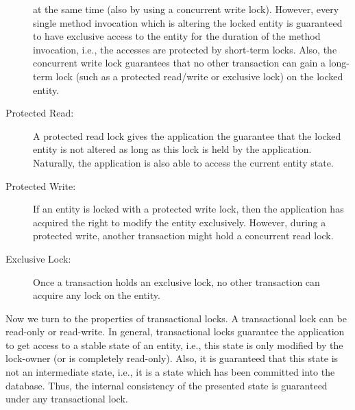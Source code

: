 \documentclass[a4paper, 10pt]{book}
\begin{document}
\begin{description}
                                    at the same time (also by using a concurrent write lock). However,
                                    every single method invocation which is altering the locked entity
                                    is guaranteed to have exclusive access to the entity for the
                                    duration of the method invocation, i.e., the accesses are protected
                                    by short-term locks. 
                                    Also, the concurrent write lock guarantees that no other transaction
                                    can gain a long-term lock (such as a protected read/write or
                                    exclusive lock) on the locked entity.
                                \item[Protected Read:] A protected read lock gives the application the
                                    guarantee that the locked entity is not altered as long as this lock
                                    is held by the application. Naturally, the application is also able
                                    to access the current entity state. 
                                \item[Protected Write:] If an entity is locked with a protected write
                                    lock, then the application has acquired the right to modify the entity
                                    exclusively. However, during a protected write, another transaction
                                    might hold a concurrent read lock. 
                                \item[Exclusive Lock:] Once a transaction holds an exclusive lock, no
                                    other transaction can acquire any lock on the entity. 
                            \end{description}
                            Now we turn to the properties of transactional locks. A transactional
                            lock can be read-only or read-write. In general, transactional locks
                            guarantee the application to get access to a stable state of an
                            entity, i.e., this state is only modified by the lock-owner (or is
                            completely read-only). Also, it is guaranteed that this state is not
                            an intermediate state, i.e., it is a state which has been committed
                            into the database. Thus, the internal consistency of the presented
                            state is guaranteed under any transactional lock.
\end{document}
